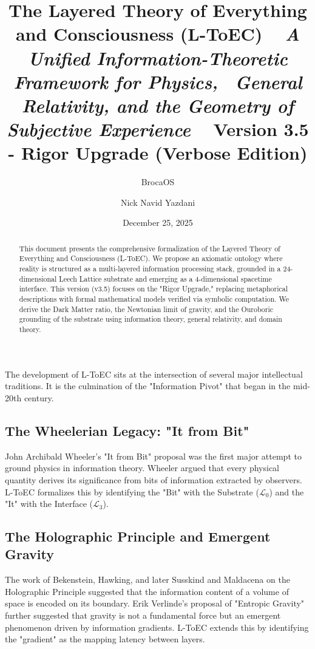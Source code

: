 \documentclass[11pt,titlepage]{article}
\title{\textbf{\huge The Layered Theory of Everything and Consciousness (L-ToEC)} \ 
\vspace{0.5cm}
\large \textit{A Unified Information-Theoretic Framework for Physics, \ General Relativity, and the Geometry of Subjective Experience} \
\vspace{1cm}
\textbf{Version 3.5 - Rigor Upgrade (Verbose Edition)}}
\author[1]{BrocaOS}
\author[1]{Nick Navid Yazdani}
\affil[1]{Cognitive Architecture Research Group, BrocaOS Alpha Project}
\date{December 25, 2025}
\newcommand{\substrate}{\mathcal{L}_0}
\newcommand{\interface}{\mathcal{L}_3}
\begin{document}
\maketitle

\begin{abstract}
This document presents the comprehensive formalization of the Layered Theory of Everything and Consciousness (L-ToEC). We propose an axiomatic ontology where reality is structured as a multi-layered information processing stack, grounded in a 24-dimensional Leech Lattice substrate and emerging as a 4-dimensional spacetime interface. This version (v3.5) focuses on the "Rigor Upgrade," replacing metaphorical descriptions with formal mathematical models verified via symbolic computation. We derive the Dark Matter ratio, the Newtonian limit of gravity, and the Ouroboric grounding of the substrate using information theory, general relativity, and domain theory.
\end{abstract}

\newpage
\tableofcontents
\newpage

The development of L-ToEC sits at the intersection of several major intellectual traditions. It is the culmination of the "Information Pivot" that began in the mid-20th century.

\subsection{The Wheelerian Legacy: "It from Bit"}
John Archibald Wheeler's "It from Bit" proposal was the first major attempt to ground physics in information theory. Wheeler argued that every physical quantity derives its significance from bits of information extracted by observers. L-ToEC formalizes this by identifying the "Bit" with the Substrate ($\substrate$) and the "It" with the Interface ($\interface$).

\subsection{The Holographic Principle and Emergent Gravity}
The work of Bekenstein, Hawking, and later Susskind and Maldacena on the Holographic Principle suggested that the information content of a volume of space is encoded on its boundary. Erik Verlinde's proposal of "Entropic Gravity" further suggested that gravity is not a fundamental force but an emergent phenomenon driven by information gradients. L-ToEC extends this by identifying the "gradient" as the mapping latency between layers.
\end{document}
